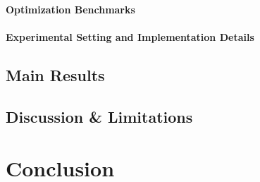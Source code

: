 \documentclass[preprint,12pt]{elsarticle}
\begin{document}
\paragraph{Optimization Benchmarks}

\paragraph{Experimental Setting and Implementation Details}

\subsection{Main Results}



\subsection{Discussion \& Limitations}



\section{Conclusion}
\label{sec:conclusion}


%

\end{document}
